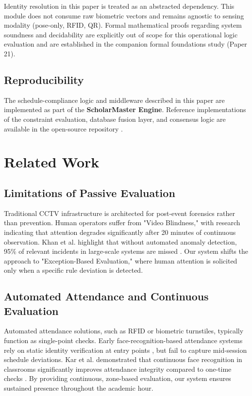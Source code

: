 \documentclass[conference]{IEEEtran}
\begin{document}
Identity resolution in this paper is treated as an abstracted dependency. This module does not consume raw biometric vectors and remains agnostic to sensing modality (pose-only, RFID, QR). Formal mathematical proofs regarding system soundness and decidability are explicitly out of scope for this operational logic evaluation and are established in the companion formal foundations study (Paper 21).

\subsection{Reproducibility}
The schedule-compliance logic and middleware described in this paper are implemented as part of the \textbf{ScholarMaster Engine}. Reference implementations of the constraint evaluation, database fusion layer, and consensus logic are available in the open-source repository \cite{scholarmaster_repo}.

\section{Related Work}

\subsection{Limitations of Passive Evaluation}
Traditional CCTV infrastructure is architected for post-event forensics rather than prevention. Human operators suffer from "Video Blindness," with research indicating that attention degrades significantly after 20 minutes of continuous observation. Khan et al. highlight that without automated anomaly detection, 95\% of relevant incidents in large-scale systems are missed \cite{b7}. Our system shifts the approach to "Exception-Based Evaluation," where human attention is solicited only when a specific rule deviation is detected.

\subsection{Automated Attendance and Continuous Evaluation}
Automated attendance solutions, such as RFID or biometric turnstiles, typically function as single-point checks. Early face-recognition-based attendance systems rely on static identity verification at entry points \cite{b2, b3}, but fail to capture mid-session schedule deviations. Kar et al. demonstrated that continuous face recognition in classrooms significantly improves attendance integrity compared to one-time checks \cite{b4}. By providing continuous, zone-based evaluation, our system ensures sustained presence throughout the academic hour.
\end{document}
